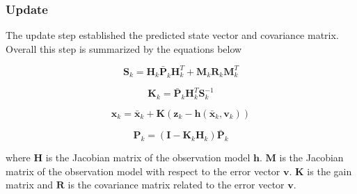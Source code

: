\subsubsection{Update}

The update step established the predicted state vector and covariance matrix. Overall this step is summarized by
the equations below

\begin{equation}
\mathbf{S}_k = \mathbf{H}_k \bar{\mathbf{P}}_k \mathbf{H}_{k}^T + \mathbf{M}_k\mathbf{R}_k\mathbf{M}_{k}^T
\end{equation}

\begin{equation}
\mathbf{K}_k = \bar{\mathbf{P}}_k \mathbf{H}_{k}^T\mathbf{S}_{k}^{-1}
\label{gain_matrix} 
\end{equation} 

\begin{equation}
\mathbf{x}_{k} = \bar{\mathbf{x}}_{k} + \mathbf{K}(\mathbf{z}_k - \mathbf{h}(\bar{\mathbf{x}}_k, \mathbf{v}_k))
\end{equation}

\begin{equation}
\mathbf{P}_k = (\mathbf{I} - \mathbf{K}_k\mathbf{H}_k)\bar{\mathbf{P}}_k
\end{equation}

where $\mathbf{H}$ is the Jacobian matrix of the observation model $\mathbf{h}$. $\mathbf{M}$ is the Jacobian matrix of 
the observation model with respect to the error vector $\mathbf{v}$.  $\mathbf{K}$ is the
gain matrix and $\mathbf{R}$ is the covariance matrix related to the error vector $\mathbf{v}$.
 
